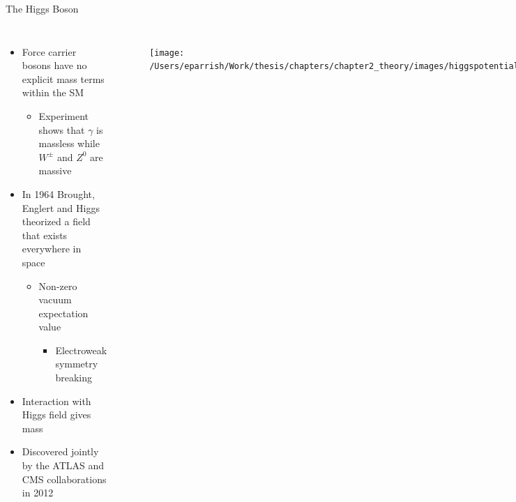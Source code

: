 \documentclass[aspectratio=169,xcolor=table]{beamer}
\begin{document}
  \begin{frame}[t]{The Higgs Boson}
    \begin{columns}[t]
      \begin{itemize}
            \item Force carrier bosons have no explicit mass terms within the SM
            \begin{itemize}
              \item Experiment shows that $\gamma$ is massless while $W^{\pm}$ and $Z^{0}$ are massive
            \end{itemize}
            \item In 1964 Brought, Englert and Higgs theorized a field that exists everywhere in space {\tiny\cite{Higgs-paper}}
            \begin{itemize}
              \item Non-zero vacuum expectation value
              \begin{itemize}
                \item Electroweak symmetry breaking
              \end{itemize}
            \end{itemize}
            \item Interaction with Higgs field gives mass
        \item Discovered jointly by the ATLAS and CMS collaborations in 2012
      \end{itemize}
      \centering
      \begin{figure}
        \texttt{[image: /Users/eparrish/Work/thesis/chapters/chapter2\_theory/images/higgspotential.png]}
        \caption{\tiny \cite{Higgs-phys}}
      \end{figure}
      \begin{figure}
        \texttt{[image: /Users/eparrish/Work/thesis/chapters/chapter2\_theory/images/Higgs\_Discovery\_gam\_gam.png]}
        \caption{\tiny \cite{higgs-discovery-atlas}}
      \end{figure}
    \end{columns}
  \end{frame}
\end{document}
